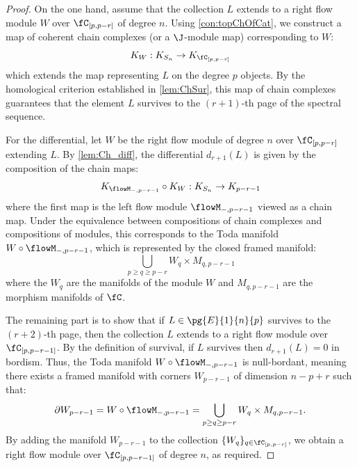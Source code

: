 \begin{proof}
    On the one hand, assume that the collection $L$ extends to a right flow module $W$ over $\fC_{[p,p-r]}$ of degree $n$. Using \cref{con:topChOfCat}, we construct a map of coherent chain complexes (or a $\J$-module map) corresponding to $W$:
    \begin{equation*}
        K_W: K_{S_n} \to K_{\fC_{[p,p-r]}}
    \end{equation*}
    which extends the map representing $L$ on the degree $p$ objects. By the homological criterion established in \cref{lem:ChSur}, this map of chain complexes guarantees that the element $L$ survives to the $(r+1)$-th page of the spectral sequence.
    
    For the differential, let $W$ be the right flow module of degree $n$ over $\fC_{[p,p-r]}$ extending $L$. By \cref{lem:Ch_diff}, the differential $d_{r+1}(L)$ is given by the composition of the chain maps:
    \begin{equation*}
        K_{\flowM_{-, p-r-1}} \circ K_W: K_{S_n} \to K_{p-r-1}
    \end{equation*}
    where the first map is the left flow module $\flowM_{-, p-r-1}$ viewed as a chain map.
    Under the equivalence between compositions of chain complexes and compositions of modules, this corresponds to the Toda manifold $W \circ \flowM_{-, p-r-1}$, which is represented by the closed framed manifold:
    \begin{equation*}
        \bigcup_{p \geq q \geq p-r} W_q \times M_{q, p-r-1}
    \end{equation*}
    where the $W_q$ are the manifolds of the module $W$ and $M_{q, p-r-1}$ are the morphism manifolds of $\fC$.
    
    The remaining part is to show that if $L \in \pg{E}{1}{n}{p}$ survives to the $(r+2)$-th page, then the collection $L$ extends to a right flow module over $\fC_{[p, p-r-1]}$. By the definition of survival, if $L$ survives then $d_{r+1}(L) = 0$ in bordism. Thus, the Toda manifold $W \circ \flowM_{-, p-r-1}$ is null-bordant, meaning there exists a framed manifold with corners $W_{p-r-1}$ of dimension $n-p+r$ such that:
    \begin{equation*}
        \partial W_{p-r-1} = W \circ \flowM_{-, p-r-1} = \bigcup_{p \geq q\geq p-r} W_q\times M_{q,p-r-1}.
    \end{equation*}
    By adding the manifold $W_{p-r-1}$ to the collection $\{W_q\}_{q \in \fC_{[p,p-r]}}$, we obtain a right flow module over $\fC_{[p, p-r-1]}$ of degree $n$, as required.
\end{proof}

